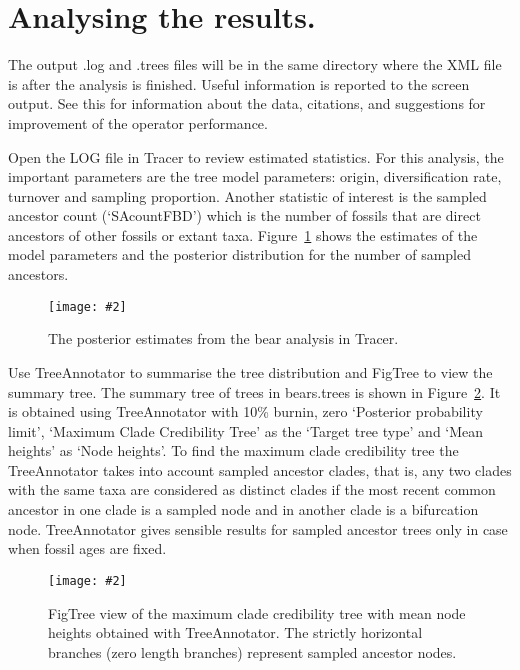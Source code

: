 \documentclass[12pt]{article}
\newcommand{\includeimage}[2][]{%
\texttt{[image: \#2]}
}
\begin{document}
\section{Analysing the results.} 

The output .log and .trees files will be in the same directory where the XML file is after the analysis is finished. Useful information is reported to the screen output. See this for information about the data, citations, and suggestions for improvement of the operator performance.  

Open the LOG file in Tracer to review estimated statistics. For this analysis, the important parameters are the tree model parameters: origin, diversification rate, turnover and sampling proportion. Another statistic of interest is the sampled ancestor count (`SAcountFBD') which is the number of fossils that are direct ancestors of other fossils or extant taxa. Figure~\ref{fig:TracerOutput} shows the estimates of the model parameters and the posterior distribution for the number of sampled ancestors. 

\begin{figure}	
\centering
\includeimage[width=\textwidth]{figures/TracerOutput}
\caption{The posterior estimates from the bear analysis in Tracer. \label{fig:TracerOutput}}
\end{figure}

Use TreeAnnotator to summarise the tree distribution and FigTree to view the summary tree. The summary tree of trees in bears.trees is shown in Figure~\ref{fig:FigTree}. It is obtained using TreeAnnotator with 10\% burnin, zero `Posterior probability limit', `Maximum Clade Credibility Tree' as the `Target tree type' and `Mean heights' as `Node heights'. To find the maximum clade credibility tree the TreeAnnotator takes into account sampled ancestor clades, that is, any two clades with the same taxa are considered as distinct clades if the most recent common ancestor in one clade is a sampled node and in another clade is a bifurcation node. TreeAnnotator gives sensible results for sampled ancestor trees only in case when fossil ages are fixed.  

\begin{figure}	
\centering
\includeimage[width=\textwidth]{figures/FigTree}
\caption{FigTree view of the maximum clade credibility tree with mean node heights obtained with TreeAnnotator. The strictly horizontal branches (zero length branches) represent sampled ancestor nodes. \label{fig:FigTree}}
\end{figure}



\end{document}
